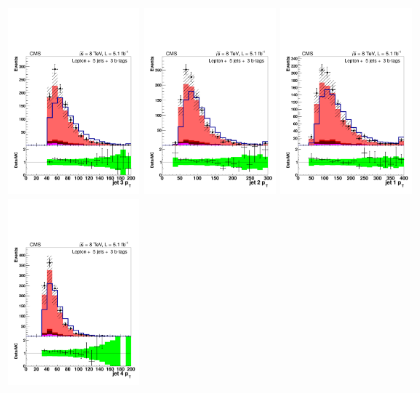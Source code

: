 \begin{figure}[hbtp]
 \begin{center}
   \includegraphics[width=0.31\textwidth]{Figures/Analysis_1_Diagrams/d2MCPlots_third_jet_pt_cut5_j5_t3_Combined_HtWgt.pdf}
   \includegraphics[width=0.31\textwidth]{Figures/Analysis_1_Diagrams/d2MCPlots_second_jet_pt_cut5_j5_t3_Combined_HtWgt.pdf}
   \includegraphics[width=0.31\textwidth]{Figures/Analysis_1_Diagrams/d2MCPlots_first_jet_pt_cut5_j5_t3_Combined_HtWgt.pdf}
   \includegraphics[width=0.31\textwidth]{Figures/Analysis_1_Diagrams/d2MCPlots_fourth_jet_pt_cut5_j5_t3_Combined_HtWgt.pdf}

\end{center}
\end{figure}

